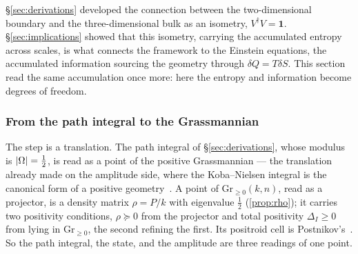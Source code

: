 \S\ref{sec:derivations} developed the connection between the two-dimensional boundary and the
three-dimensional bulk as an isometry, $V^{\dagger}V=\mathbf1$. \S\ref{sec:implications} showed that
this isometry, carrying the accumulated entropy across scales, is what connects the framework to the
Einstein equations, the accumulated information sourcing the geometry through
$\delta Q=T\delta S$. This section read the same accumulation once more: here the entropy and
information become degrees of freedom.

\subsubsection{From the path integral to the Grassmannian}\label{sssec:disc-dof-grass}
The step is a translation. The path integral of \S\ref{sec:derivations}, whose modulus is
$\lvert\Omega\rvert=\tfrac12$, is read as a point of the positive Grassmannian --- the translation
already made on the amplitude side, where the Koba--Nielsen integral is the canonical form of a
positive geometry~\cite{ABHY18,AHL19}. A point of $\mathrm{Gr}_{\ge0}(k,n)$, read as a projector, is a
density matrix $\rho=P/k$ with eigenvalue $\tfrac12$ (\ref{prop:rho}); it carries two positivity
conditions, $\rho\succeq0$ from the projector and total positivity $\Delta_I\ge0$ from lying in
$\mathrm{Gr}_{\ge0}$, the second refining the first. Its positroid cell is Postnikov's~\cite{Postnikov}. So the
path integral, the state, and the amplitude are three readings of one point.

